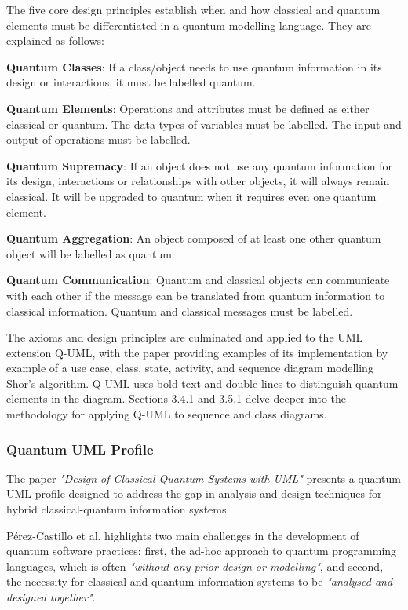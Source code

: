 \documentclass{article}
\begin{document}
{The five core design principles establish when and how classical and quantum elements must be differentiated in a quantum modelling language. They are explained as follows: 

\textbf{Quantum Classes}: If a class/object needs to use quantum information in its design or interactions, it must be labelled quantum.

\textbf{Quantum Elements}: Operations and attributes must be defined as either classical or quantum. The data types of variables must be labelled. The input and output of operations must be labelled. 

\textbf{Quantum Supremacy}: If an object does not use any quantum information for its design, interactions or relationships with other objects, it will always remain classical. It will be upgraded to quantum when it requires even one quantum element. 

\textbf{Quantum Aggregation}: An object composed of at least one other quantum object will be labelled as quantum.

\textbf{Quantum Communication}: Quantum and classical objects can communicate with each other if the message can be translated from quantum information to classical information. Quantum and classical messages must be labelled.

The axioms and design principles are culminated and applied to the UML extension Q-UML, with the paper providing examples of its implementation by example of a use case, class, state, activity, and sequence diagram modelling Shor's algorithm\cite{Pérez-Delgado2022}. Q-UML uses bold text and double lines to distinguish quantum elements in the diagram. Sections 3.4.1 and 3.5.1 delve deeper into the methodology for applying Q-UML to sequence and class diagrams.

\subsubsection{Quantum UML Profile}

The paper \textit{"Design of Classical-Quantum Systems with UML"} presents a quantum UML profile designed to address the gap in analysis and design techniques for hybrid classical-quantum information systems\cite{Pérez-Castillo2022}. 

Pérez-Castillo et al. highlights two main challenges in the development of quantum software practices: first, the ad-hoc approach to quantum programming languages, which is often \textit{"without any prior design or modelling"}\cite{Pérez-Castillo2022}, and second, the necessity for classical and quantum information systems to be \textit{"analysed and designed together"}\cite{Pérez-Castillo2022}. 

}
\end{document}
